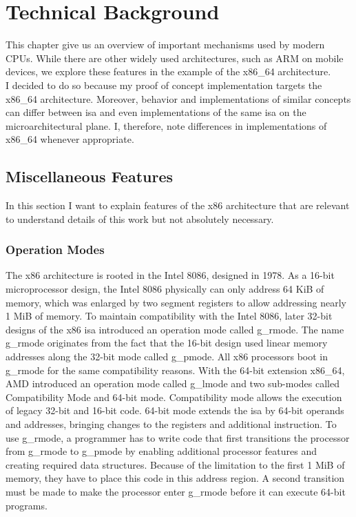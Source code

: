 \section{Technical Background}
\label{sec:state:technical}
This chapter give us an overview of important mechanisms used by modern CPUs.
While there are other widely used architectures, such as ARM on mobile devices,
we explore these features in the example of the x86\_64 architecture. \\

I decided to do so because my proof of concept implementation targets the
x86\_64 architecture. Moreover, behavior and implementations of similar concepts
can differ between \gls{isa} and even implementations of the
same \gls{isa} on the microarchitectural plane. I, therefore, note
differences in implementations of x86\_64 whenever appropriate.

\subsection{Miscellaneous Features}
\label{sec:state:technical:misc}
In this section I want to explain features of the x86 architecture that are
relevant to understand details of this work but not absolutely necessary.

\subsubsection{Operation Modes}
\label{sec:state:technical:modes}
The x86 architecture is rooted in the Intel 8086, designed in 1978. As a 16-bit
microprocessor design, the Intel 8086 physically can only address 64 KiB of
memory, which was enlarged by two segment registers to allow addressing nearly 1
MiB of memory. To maintain compatibility with the Intel 8086, later 32-bit
designs of the x86 \gls{isa} introduced an operation mode called \gls{g_rmode}.
The name \gls{g_rmode} originates from the fact that the 16-bit design used
linear memory addresses along the 32-bit mode called \gls{g_pmode}. All x86
processors boot in \gls{g_rmode} for the same compatibility reasons. With the
64-bit extension x86\_64, AMD introduced an operation mode called \gls{g_lmode}
and two sub-modes called Compatibility Mode and 64-bit mode. Compatibility mode
allows the execution of legacy 32-bit and 16-bit code. 64-bit mode extends the
\gls{isa} by 64-bit operands and addresses, bringing changes to the registers
and additional instruction. To use \gls{g_rmode}, a programmer has to write code
that first transitions the processor from \gls{g_rmode} to \gls{g_pmode} by
enabling additional processor features and creating required data structures.
Because of the limitation to the first 1 MiB of memory, they have to place this
code in this address region. A second transition must be made to make the
processor enter \gls{g_rmode} before it can execute 64-bit programs.

